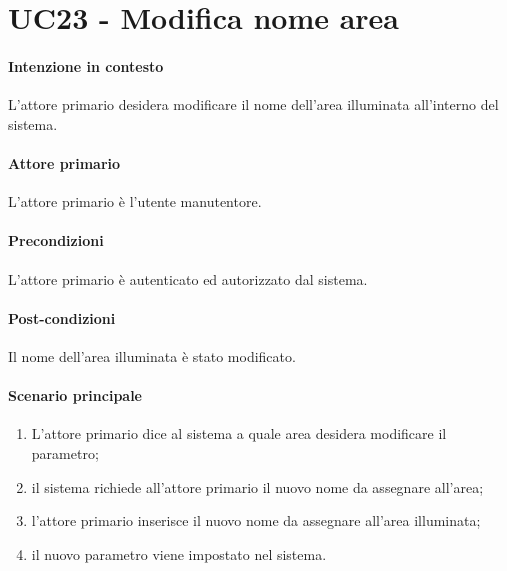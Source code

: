 \section{UC23 - Modifica nome area}\label{uc:23}
\paragraph{Intenzione in contesto} L'attore primario desidera modificare il nome dell'area illuminata all'interno del sistema.
\paragraph{Attore primario} L'attore primario è l'utente manutentore.
\paragraph{Precondizioni}  L'attore primario è autenticato ed autorizzato dal sistema.
\paragraph{Post-condizioni} Il nome dell'area illuminata è stato modificato.
\paragraph{Scenario principale}
\begin{enumerate}
    \item L'attore primario dice al sistema a quale area desidera modificare il parametro;
    \item il sistema richiede all'attore primario il nuovo nome da assegnare all'area;
    \item l'attore primario inserisce il nuovo nome da assegnare all'area illuminata;
    \item il nuovo parametro viene impostato nel sistema.
\end{enumerate}